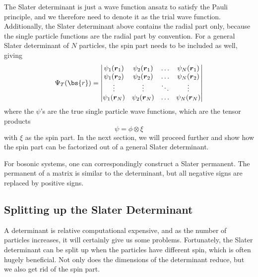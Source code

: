 The Slater determinant is just a wave function ansatz to satisfy the Pauli principle, and we therefore need to denote it as the trial wave function. Additionally, the Slater determinant above contains the radial part only, because the single particle functions are the radial part by convention. For a general Slater determinant of $N$ particles, the spin part needs to be included as well, giving 
\begin{equation}
\Psi_T(\bs{r})=
\begin{vmatrix}
\psi_1(\boldsymbol{r}_1) & \psi_2(\boldsymbol{r}_1) & \hdots & \psi_N(\boldsymbol{r}_1)\\
\psi_1(\boldsymbol{r}_2) & \psi_2(\boldsymbol{r}_2) & \hdots & \psi_N(\boldsymbol{r}_2)\\
\vdots & \vdots & \ddots & \vdots \\
\psi_1(\boldsymbol{r}_N) & \psi_2(\boldsymbol{r}_N) & \hdots & \psi_N(\boldsymbol{r}_N)
\end{vmatrix}
\end{equation}
where the $\psi$'s are the true single particle wave functions, which are the tensor products 
\begin{equation}
\psi=\phi\otimes\xi
\end{equation}
with $\xi$ as the spin part. In the next section, we will proceed further and show how the spin part can be factorized out of a general Slater determinant.

For bosonic systems, one can correspondingly construct a Slater permanent. The permanent of a matrix is similar to the determinant, but all negative signs are replaced by positive signs. 

\subsection{Splitting up the Slater Determinant} \label{subsec:electronsystem}
A determinant is relative computational expensive, and as the number of particles increases, it will certainly give us some problems. Fortunately, the Slater determinant can be split up when the particles have different spin, which is often hugely beneficial. Not only does the dimensions of the determinant reduce, but we also get rid of the spin part.

